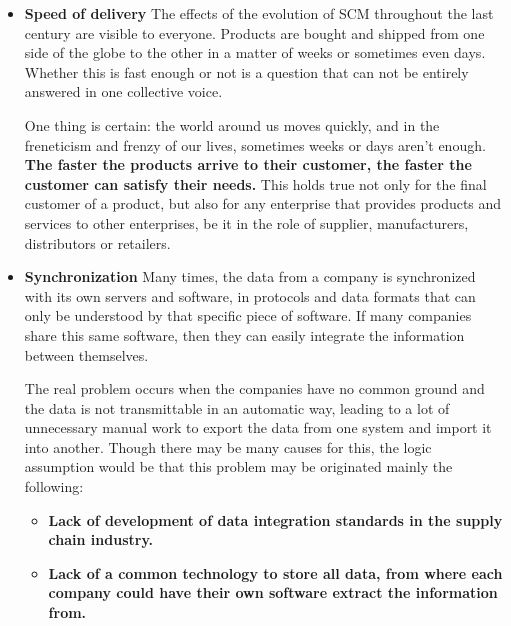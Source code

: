 \begin{itemize}
\item \textbf{Speed of delivery}
The effects of the evolution of SCM throughout the last century are visible to everyone. Products are bought and shipped from one side of the globe to the other in a matter of weeks or sometimes even days. Whether this is fast enough or not is a question that can not be entirely answered in one collective voice. 

One thing is certain: the world around us moves quickly, and in the freneticism and frenzy of our lives, sometimes weeks or days aren't enough.  \textbf{The faster the products arrive to their customer, the faster the customer can satisfy their needs.}  This holds true not only for the final customer of a product, but also for any enterprise that provides products and services to other enterprises, be it in the role of supplier, manufacturers, distributors or retailers. 

\item \textbf{Synchronization}
Many times, the data from a company is synchronized with its own servers and software, in protocols and data formats that can only be understood by that specific piece of software. If many companies share this same software, then they can easily integrate the information between themselves.

The real problem occurs when the companies have no common ground and the data is not transmittable in an automatic way, leading to a lot of unnecessary manual work to export the data from one system and import it into another. Though there may be many causes for this, the logic assumption would be that this problem may be originated mainly the following:


\begin{itemize}
\item \textbf{Lack of development of data integration standards in the supply chain industry.}
\item \textbf{Lack of a common technology to store all data, from where each company could have their own software extract the information from.}
\end{itemize}


\end{itemize}
